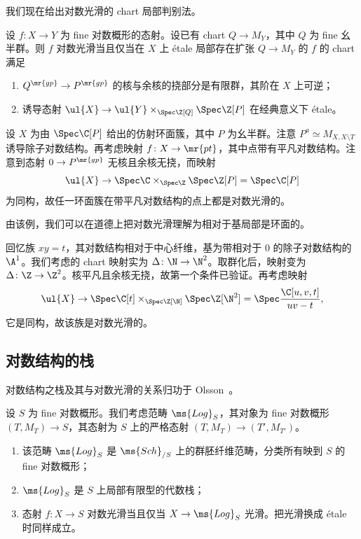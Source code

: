 我们现在给出对数光滑的 chart 局部判别法。

\begin{thm}
    设 \(f \colon X \to Y\) 为 fine 对数概形的态射。设已有 chart \(Q \to M_Y\)，其中 \(Q\) 为 fine 幺半群。则 \(f\) 对数光滑当且仅当在 \(X\) 上 \'etale 局部存在扩张 \(Q \to M_Y\) 的 \(f\) 的 chart 满足
    \begin{enumerate}
        \item \(Q^{\mr{gp}} \to P^{\mr{gp}}\) 的核与余核的挠部分是有限群，其阶在 \(X\) 上可逆；
        \item 诱导态射 \(\ul{X} \to \ul{Y} \times_{\Spec \Z[Q]} \Spec \Z[P]\) 在经典意义下 \'etale。
    \end{enumerate}
\end{thm}

\begin{exm}
    设 \(X\) 为由 \(\Spec \C[P]\) 给出的仿射环面簇，其中 \(P\) 为幺半群。注意 \(P^a \simeq M_{X, X \setminus T}\) 诱导除子对数结构。再考虑映射 \(f \colon X \to \mr{pt}\)，其中点带有平凡对数结构。注意到态射 \(0 \to P^{\mr{gp}}\) 无核且余核无挠，而映射
    \[ \ul{X} \to \Spec \C \times_{\Spec \Z} \Spec \Z[P] = \Spec \C[P] \]
    为同构，故任一环面簇在带平凡对数结构的点上都是对数光滑的。
\end{exm}

由该例，我们可以在道德上把对数光滑理解为相对于基局部是环面的。

\begin{exm}
    回忆族 \(xy = t\)，其对数结构相对于中心纤维，基为带相对于 \(0\) 的除子对数结构的 \(\A^1\)。我们考虑的 chart 映射实为 \(\Delta \colon \N \to \N^2\)。取群化后，映射变为 \(\Delta \colon \Z \to \Z^2\)。核平凡且余核无挠，故第一个条件已验证。再考虑映射
    \[ \ul{X} \to \Spec \C[t] \times_{\Spec \Z[\N]} \Spec \Z[\N^2] = \Spec \frac{\C[u,v,t]}{uv-t}, \]
    它是同构，故该族是对数光滑的。
\end{exm}

\subsection{对数结构的栈}%
\label{sub:Stack of log structures}

对数结构之栈及其与对数光滑的关系归功于 Olsson~\cite{Olsson2003}。

设 \(S\) 为 fine 对数概形。我们考虑范畴 \(\ms{Log}_S\)，其对象为 fine 对数概形 \((T, M_T) \to S\)，其态射为 \(S\) 上的严格态射 \((T, M_T) \to (T', M_{T'})\)。
\begin{enumerate}
    \item 该范畴 \(\ms{Log}_S\) 是 \(\ms{Sch}_{/S}\) 上的群胚纤维范畴，分类所有映到 \(S\) 的 fine 对数概形；
    \item \(\ms{Log}_S\) 是 \(S\) 上局部有限型的代数栈；
    \item 态射 \(f \colon X \to S\) 对数光滑当且仅当 \(X \to \ms{Log}_S\) 光滑。把光滑换成 \'etale 时同样成立。
\end{enumerate}


